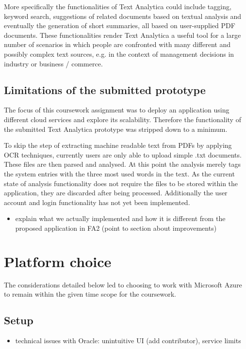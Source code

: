 \documentclass[conference]{IEEEtran}
\begin{document}
More specifically the functionalities of Text Analytica could include tagging, keyword search, suggestions of related documents based on textual analysis and eventually the generation of short summaries, all based on user-supplied PDF documents. These functionalities render Text Analytica a useful tool for a large number of scenarios in which people are confronted with many different and possibly complex text sources, e.g. in the context of management decisions in industry or business / commerce.

\subsection{Limitations of the submitted prototype}
The focus of this coursework assignment was to deploy an application using different cloud services and explore its scalability. Therefore the functionality of the submitted Text Analytica prototype was stripped down to a minimum.

To skip the step of extracting machine readable text from PDFs by applying OCR techniques, currently users are only able to upload simple .txt documents. These files are then parsed and analysed. At this point the analysis merely tags the system entries with the three most used words in the text. As the current state of analysis functionality does not require the files to be stored within the application, they are discarded after being processed. Additionally the user account and login functionality has not yet been implemented.

\begin{itemize}
	\item explain what we actually implemented and how it is different from the proposed application in FA2 (point to section about improvements)
\end{itemize}

\section{Platform choice}
\label{sec:platform-choice}
The considerations detailed below led to choosing to work with Microsoft Azure to remain within the given time scope for the coursework.
\subsection{Setup}
\begin{itemize}
	\item technical issues with Oracle: unintuitive UI (add contributor), service limits
\end{itemize}
\end{document}
